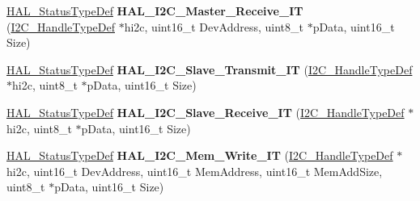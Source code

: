 \begin{DoxyCompactItemize}
\item 
\mbox{\label{group___i2_c___exported___functions___group2_ga2aebdb302ffc0a4dff28dc2c8b59e1e9}} 
\mbox{\hyperlink{stm32f7xx__hal__def_8h_a63c0679d1cb8b8c684fbb0632743478f}{H\+A\+L\+\_\+\+Status\+Type\+Def}} {\bfseries H\+A\+L\+\_\+\+I2\+C\+\_\+\+Master\+\_\+\+Receive\+\_\+\+IT} (\mbox{\hyperlink{struct_____i2_c___handle_type_def}{I2\+C\+\_\+\+Handle\+Type\+Def}} $\ast$hi2c, uint16\+\_\+t Dev\+Address, uint8\+\_\+t $\ast$p\+Data, uint16\+\_\+t Size)
\item 
\mbox{\label{group___i2_c___exported___functions___group2_gabb5814408402b2e9d07c0b414e64fc9d}} 
\mbox{\hyperlink{stm32f7xx__hal__def_8h_a63c0679d1cb8b8c684fbb0632743478f}{H\+A\+L\+\_\+\+Status\+Type\+Def}} {\bfseries H\+A\+L\+\_\+\+I2\+C\+\_\+\+Slave\+\_\+\+Transmit\+\_\+\+IT} (\mbox{\hyperlink{struct_____i2_c___handle_type_def}{I2\+C\+\_\+\+Handle\+Type\+Def}} $\ast$hi2c, uint8\+\_\+t $\ast$p\+Data, uint16\+\_\+t Size)
\item 
\mbox{\label{group___i2_c___exported___functions___group2_ga48113a4abed4b32ac19da51babb530eb}} 
\mbox{\hyperlink{stm32f7xx__hal__def_8h_a63c0679d1cb8b8c684fbb0632743478f}{H\+A\+L\+\_\+\+Status\+Type\+Def}} {\bfseries H\+A\+L\+\_\+\+I2\+C\+\_\+\+Slave\+\_\+\+Receive\+\_\+\+IT} (\mbox{\hyperlink{struct_____i2_c___handle_type_def}{I2\+C\+\_\+\+Handle\+Type\+Def}} $\ast$hi2c, uint8\+\_\+t $\ast$p\+Data, uint16\+\_\+t Size)
\item 
\mbox{\label{group___i2_c___exported___functions___group2_gab57ffc32b01392d8bcce3c7ec32b3120}} 
\mbox{\hyperlink{stm32f7xx__hal__def_8h_a63c0679d1cb8b8c684fbb0632743478f}{H\+A\+L\+\_\+\+Status\+Type\+Def}} {\bfseries H\+A\+L\+\_\+\+I2\+C\+\_\+\+Mem\+\_\+\+Write\+\_\+\+IT} (\mbox{\hyperlink{struct_____i2_c___handle_type_def}{I2\+C\+\_\+\+Handle\+Type\+Def}} $\ast$hi2c, uint16\+\_\+t Dev\+Address, uint16\+\_\+t Mem\+Address, uint16\+\_\+t Mem\+Add\+Size, uint8\+\_\+t $\ast$p\+Data, uint16\+\_\+t Size)
\item 
\mbox{\label{group___i2_c___exported___functions___group2_ga2274a9d894a1dc783bc647f937200f65}} 

\end{DoxyCompactItemize}
